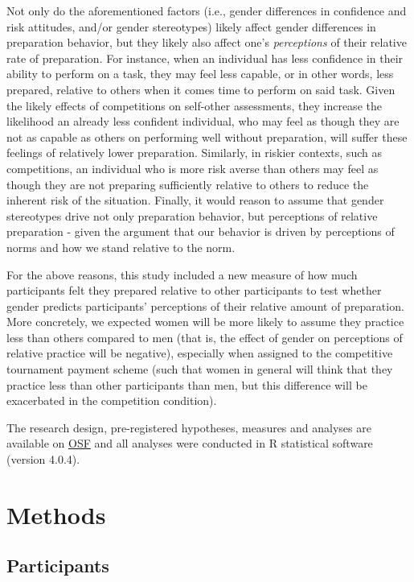 \documentclass[a4paper, nobind]{templates/ociamthesis}
\begin{document}
Not only do the aforementioned factors (i.e., gender differences in confidence and risk attitudes, and/or gender stereotypes) likely affect gender differences in preparation behavior, but they likely also affect one's \emph{perceptions} of their relative rate of preparation. For instance, when an individual has less confidence in their ability to perform on a task, they may feel less capable, or in other words, less prepared, relative to others when it comes time to perform on said task. Given the likely effects of competitions on self-other assessments, they increase the likelihood an already less confident individual, who may feel as though they are not as capable as others on performing well without preparation, will suffer these feelings of relatively lower preparation. Similarly, in riskier contexts, such as competitions, an individual who is more risk averse than others may feel as though they are not preparing sufficiently relative to others to reduce the inherent risk of the situation. Finally, it would reason to assume that gender stereotypes drive not only preparation behavior, but perceptions of relative preparation - given the argument that our behavior is driven by perceptions of norms and how we stand relative to the norm.

For the above reasons, this study included a new measure of how much participants felt they prepared relative to other participants to test whether gender predicts participants' perceptions of their relative amount of preparation. More concretely, we expected women will be more likely to assume they practice less than others compared to men (that is, the effect of gender on perceptions of relative practice will be negative), especially when assigned to the competitive tournament payment scheme (such that women in general will think that they practice less than other participants than men, but this difference will be exacerbated in the competition condition).

The research design, pre-registered hypotheses, measures and analyses are available on \href{https://osf.io/8bwfz/}{OSF} and all analyses were conducted in R statistical software (version 4.0.4).

\hypertarget{methods-3}{%
\section{Methods}\label{methods-3}}

\hypertarget{participants-3}{%
\subsection{Participants}\label{participants-3}}
\end{document}
